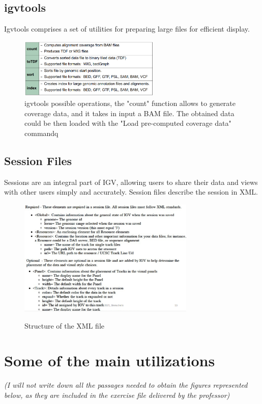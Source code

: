 \subsection*{igvtools}
Igvtools comprises a set of utilities for preparing large files for efficient display.

\begin{figure}[H]
    \caption{igvtools possible operations, the "count" function allows to generate coverage data, and it takes in input a BAM file. The obtained data could be then loaded with the "Load pre-computed coverage data" commandq}
    \centering
    \includegraphics[width=0.6\textwidth]{igvtools.PNG}
\end{figure}

\subsection*{Session Files}
Sessions are an integral part of IGV, allowing users to share their data and
views with other users simply and accurately. Session files describe the session
in XML.

\begin{figure}[H]
    \caption{Structure of the XML file}
    \centering
    \includegraphics[width=0.75\textwidth]{structureXMLfile.PNG}
    \label{XMLfile}
\end{figure} 



\section*{Some of the main utilizations}
\textit{(I will not write down all the passages needed to obtain the figures represented
below, as they are included in the exercise file delivered by the professor)}

